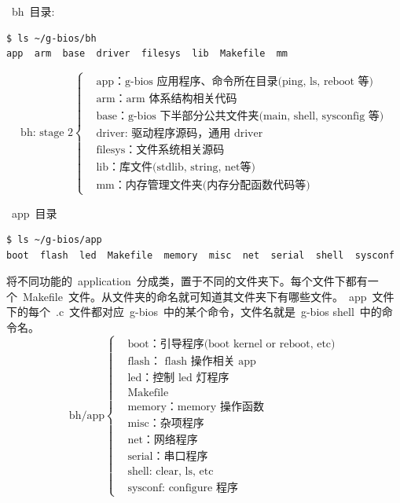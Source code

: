 \documentclass[a4paper,11pt]{book}
\begin{document}
~bh~目录:
\begin{lstlisting}[language=bash, numbers=none]
$ ls ~/g-bios/bh
app  arm  base  driver  filesys  lib  Makefile  mm
\end{lstlisting}

\begin{equation*}
\text{bh: stage 2}
\left\{
	\begin{aligned}
	&\text{app：g-bios~应用程序、命令所在目录(ping, ls, reboot~等)} \\
	&\text{arm：arm~体系结构相关代码} \\
	&\text{base：g-bios~下半部分公共文件夹(main, shell, sysconfig~等)} \\
	&\text{driver: 驱动程序源码，通用~driver~} \\
	&\text{filesys：文件系统相关源码} \\
	&\text{lib：库文件(stdlib, string, net等)} \\
	&\text{mm：内存管理文件夹(内存分配函数代码等)}
	\end{aligned}
\right.
\end{equation*}

~app~目录

\begin{lstlisting}[language=bash, numbers=none]
$ ls ~/g-bios/app
boot  flash  led  Makefile  memory  misc  net  serial  shell  sysconf
\end{lstlisting}
将不同功能的~application~分成类，置于不同的文件夹下。每个文件下都有一个~Makefile~文件。从文件夹的命名就可知道其文件夹下有哪些文件。~app~文件下的每个~.c~文件都对应~g-bios~中的某个命令，文件名就是~g-bios shell~中的命令名。
\begin{equation*}
\text{bh/app}
\left\{
	\begin{aligned}
	&\text{boot：引导程序(boot kernel or reboot, etc)} \\
	&\text{flash：~flash~操作相关~app~} \\
	&\text{led：控制~led~灯程序} \\
	&\text{Makefile} \\
	&\text{memory：memory~操作函数} \\
	&\text{misc：杂项程序} \\
	&\text{net：网络程序} \\
	&\text{serial：串口程序} \\
	&\text{shell: clear, ls, etc} \\
	&\text{sysconf: configure~程序}
	\end{aligned}
\right.
\end{equation*}
\end{document}
